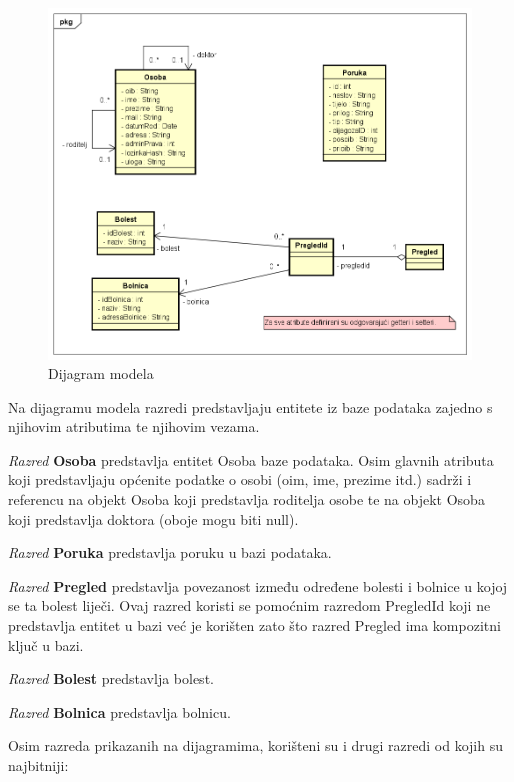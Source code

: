 			\begin{figure}[H]
				\includegraphics[width=\textwidth]{dijagrami/DijagramDomain.PNG} %
				\caption{Dijagram modela}
				\label{fig:dijagramdomain} %
			\end{figure}
			
			Na dijagramu modela razredi predstavljaju entitete iz baze podataka zajedno s njihovim atributima te njihovim vezama.
			
			\textit{Razred }\textbf{Osoba}
			predstavlja entitet Osoba baze podataka. 
			Osim glavnih atributa koji predstavljaju općenite podatke o osobi (oim, ime, prezime itd.) sadrži i referencu na objekt Osoba koji predstavlja roditelja osobe te na objekt Osoba koji predstavlja doktora (oboje mogu biti null).
			
			\textit{Razred }\textbf{Poruka} predstavlja poruku u bazi podataka. 
			
			\textit{Razred }\textbf{Pregled} predstavlja povezanost između određene bolesti i bolnice u kojoj se ta bolest liječi. Ovaj razred koristi se pomoćnim razredom PregledId koji ne predstavlja entitet u bazi već je korišten zato što razred Pregled ima kompozitni ključ u bazi.
			
			\textit{Razred }\textbf{Bolest} predstavlja bolest.
			
			\textit{Razred }\textbf{Bolnica} predstavlja bolnicu.
			
			
			Osim razreda prikazanih na dijagramima, korišteni su i drugi razredi od kojih su najbitniji:
			
